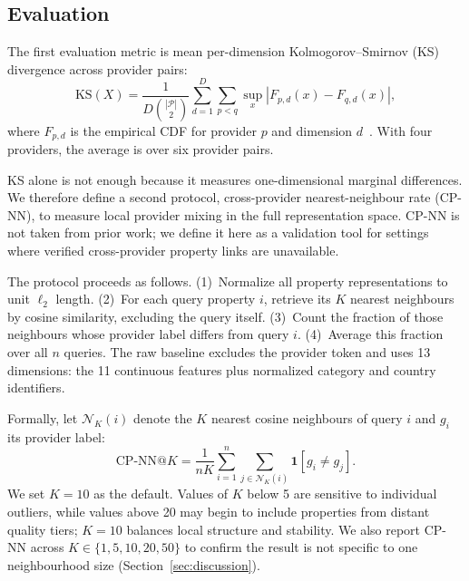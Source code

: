 \documentclass[conference,a4paper]{IEEEtran}
\begin{document}
\subsection{Evaluation}

The first evaluation metric is mean per-dimension Kolmogorov--Smirnov (KS) divergence across provider pairs:
\begin{equation}
\mathrm{KS}(X)=\frac{1}{D\binom{|\mathcal{P}|}{2}}\sum_{d=1}^{D}\sum_{p<q}
\sup_x |F_{p,d}(x)-F_{q,d}(x)| ,
\label{eq:ks}
\end{equation}
where $F_{p,d}$ is the empirical CDF for provider $p$ and dimension $d$~\cite{hodges1958significance}. With four providers, the average is over six provider pairs.

KS alone is not enough because it measures one-dimensional marginal differences. We therefore define a second protocol, cross-provider nearest-neighbour rate (CP-NN), to measure local provider mixing in the full representation space. CP-NN is not taken from prior work; we define it here as a validation tool for settings where verified cross-provider property links are unavailable.

The protocol proceeds as follows. (1)~Normalize all property representations to unit $\ell_2$ length. (2)~For each query property $i$, retrieve its $K$ nearest neighbours by cosine similarity, excluding the query itself. (3)~Count the fraction of those neighbours whose provider label differs from query $i$. (4)~Average this fraction over all $n$ queries. The raw baseline excludes the provider token and uses 13 dimensions: the 11 continuous features plus normalized category and country identifiers.

Formally, let $\mathcal{N}_K(i)$ denote the $K$ nearest cosine neighbours of query $i$ and $g_i$ its provider label:
\begin{equation}
\mathrm{CP\mbox{-}NN@}K=\frac{1}{nK}\sum_{i=1}^{n}\sum_{j\in\mathcal{N}_K(i)}
\mathbf{1}[g_i\neq g_j].
\label{eq:cpnn}
\end{equation}
We set $K=10$ as the default. Values of $K$ below 5 are sensitive to individual outliers, while values above 20 may begin to include properties from distant quality tiers; $K=10$ balances local structure and stability. We also report CP-NN across $K\in\{1,5,10,20,50\}$ to confirm the result is not specific to one neighbourhood size (Section~\ref{sec:discussion}).
\end{document}

